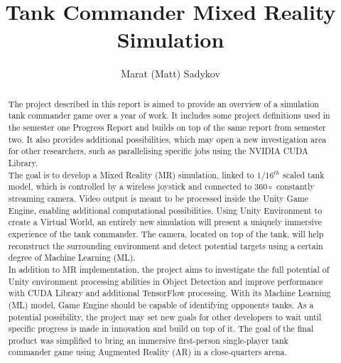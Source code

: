 \documentclass[a4paper, twoside]{report}
\title{Tank Commander Mixed Reality Simulation}
\author{Marat (Matt) Sadykov}
\begin{document}


\begin{abstract}
The project described in this report is aimed to provide an overview of a simulation tank commander game over a year of work.
It includes some project definitions used in the semester one Progress Report and builds on top of the same report from semester two.
It also provides additional possibilities, which may open a new investigation area for other researchers, such as parallelising specific jobs using the NVIDIA CUDA Library. \\     
The goal is to develop a Mixed Reality (MR) simulation, linked to $1/16^{th}$ scaled tank model, which is controlled by a wireless joystick and connected to $360\circ$ constantly streaming camera. Video output is meant to be processed inside the Unity Game Engine, enabling additional computational possibilities.
Using Unity Environment to create a Virtual World, an entirely new simulation will present a uniquely immersive experience of the tank commander.
The camera, located on top of the tank, will help reconstruct the surrounding environment and detect potential targets using a certain degree of Machine Learning (ML). \\[1pt]
In addition to MR implementation, the project aims to investigate the full potential of Unity environment processing abilities in Object Detection and improve performance with CUDA Library and additional TensorFlow processing.
With its Machine Learning (ML) model, Game Engine should be capable of identifying opponents tanks.
As a potential possibility, the project may set new goals for other developers to wait until specific progress is made in innovation and build on top of it.
The goal of the final product was simplified to bring an immersive first-person single-player tank commander game using Augmented Reality (AR) in a close-quarters arena.
\end{abstract}


\tableofcontents
\listoffigures







%



\end{document}
